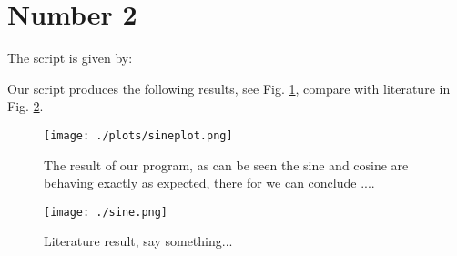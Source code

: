 \section{Number 2}



The script is given by:


Our script produces the following results, see Fig. \ref{fig:fig1},
compare with literature in Fig. \ref{fig:fig2}.


\begin{figure}[h!]
  \centering
  \texttt{[image: ./plots/sineplot.png]}
  \caption{The result of our program, as can be seen the 
  sine and cosine are behaving exactly as expected, there 
  for we can conclude ....}
  \label{fig:fig1}
\end{figure}

\begin{figure}[h!]
  \centering
  \texttt{[image: ./sine.png]}
  \caption{Literature result, say something...}
  \label{fig:fig2}
\end{figure}
